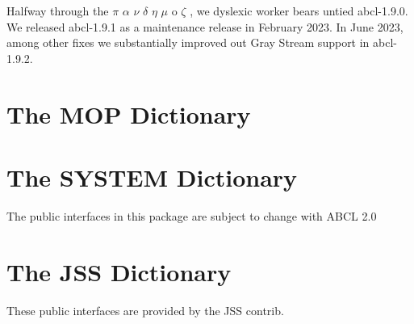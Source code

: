 \documentclass[10pt]{book}
\begin{document}
Halfway through the $\pi$ $\alpha$ $\nu$ $\delta$ $\eta$ $\mu$ o
$\zeta$ \cite{pandemos}, we dyslexic worker bears untied abcl-1.9.0.
We released abcl-1.9.1 as a maintenance release in February 2023.  In
June 2023, among other fixes we substantially improved out Gray Stream
support in abcl-1.9.2.

\appendix 

\chapter{The MOP Dictionary}



\chapter{The SYSTEM Dictionary}

The public interfaces in this package are subject to change with
\textsc{ABCL} 2.0



\chapter{The JSS Dictionary}

These public interfaces are provided by the JSS contrib.






\printindex
\end{document}
